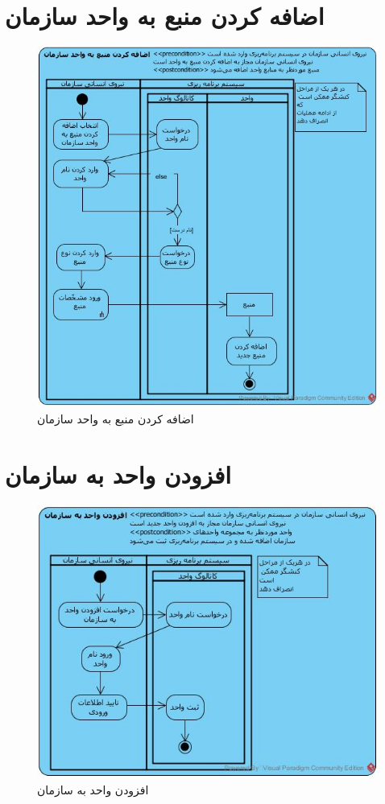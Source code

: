 \section{اضافه کردن منبع به واحد سازمان}
\begin{figure}[H]
	\centering
	\includegraphics[scale=0.7]{img/activity/AddResourceToUnit}
	\caption{اضافه کردن منبع به واحد سازمان}
\end{figure}

\section{افزودن واحد به سازمان}
\begin{figure}[H]
	\centering
	\includegraphics[scale=0.7]{img/activity/AddUnitToOrganization}
	\caption{افزودن واحد به سازمان}
\end{figure}


